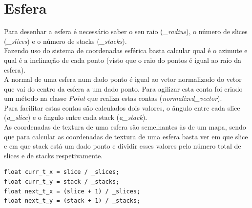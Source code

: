 \documentclass[a4paper]{report}
\begin{document}
\section{Esfera}
Para desenhar a esfera é necessário saber o seu raio (\textit{\_radius}), o
número de slices (\textit{\_slices}) e o número de stacks (\textit{\_stacks}).\\
Fazendo uso do sistema de coordenadas esférica basta calcular qual é o azimute e
qual é a inclinação de cada ponto (visto que o raio do pontos é igual ao raio da
esfera).\\
A normal de uma esfera num dado ponto é igual ao vetor normalizado do vetor que
vai do centro da esfera a um dado ponto. Para agilizar esta conta foi criado um
método na classe \textit{Point} que realiza estas contas
(\textit{normalized\_vector}).\\
Para facilitar estas contas são calculados dois valores, o ângulo entre cada
slice (\textit{a\_slice}) e o ângulo entre cada stack (\textit{a\_stack}).\\
As coordenadas de textura de uma esfera são semelhantes às de um mapa, sendo que
para calcular as coordenadas de textura de uma esfera basta ver em que slice e
em que stack está um dado ponto e dividir esses valores pelo número total de
slices e de stacks respetivamente.

\begin{lstlisting}
float curr_t_x = slice / _slices;
float curr_t_y = stack / _stacks;
float next_t_x = (slice + 1) / _slices;
float next_t_y = (stack + 1) / _stacks;
\end{lstlisting}
\end{document}
